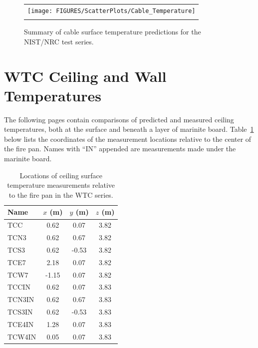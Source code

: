 \begin{figure}[p]
\begin{center}
\begin{tabular}{c}
\texttt{[image: FIGURES/ScatterPlots/Cable\_Temperature]} \\
\vspace{0.25in}
\end{tabular}
\end{center}
\caption[Summary of cable surface temperature predictions, NIST/NRC test series.]
{Summary of cable surface temperature predictions for the NIST/NRC test series.}
\end{figure}




\clearpage

\section{WTC Ceiling and Wall Temperatures}

The following pages contain comparisons of predicted and measured ceiling temperatures, both at the surface and beneath a layer of
marinite board. Table~\ref{WTC_Ceiling} below lists the coordinates of the measurement locations relative to the center of the fire pan.
Names with ``IN'' appended are measurements made under the marinite board.


\begin{table}[h!]
\caption{Locations of ceiling surface temperature measurements relative to the fire pan in the WTC series.}
\begin{center}
\begin{tabular}{|l|c|c|c|}
\hline
Name                & $x$ (m)   & $y$ (m)   & $z$ (m)   \\ \hline \hline
TCC                 & 0.62      & 0.07      & 3.82      \\ \hline
TCN3                & 0.62      & 0.67      & 3.82      \\ \hline
TCS3                & 0.62      & -0.53     & 3.82      \\ \hline
TCE7                & 2.18      & 0.07      & 3.82      \\ \hline
TCW7                & -1.15     & 0.07      & 3.82      \\ \hline \hline
TCCIN               & 0.62      & 0.07      & 3.83      \\ \hline
TCN3IN              & 0.62      & 0.67      & 3.83      \\ \hline
TCS3IN              & 0.62      & -0.53     & 3.83      \\ \hline
TCE4IN              & 1.28      & 0.07      & 3.83      \\ \hline
TCW4IN              & 0.05      & 0.07      & 3.83      \\ \hline
\end{tabular}
\end{center}
\label{WTC_Ceiling}
\end{table}

